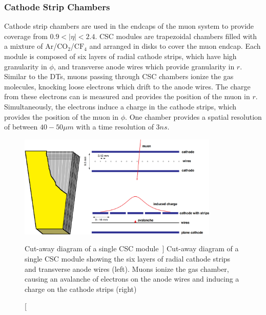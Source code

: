\subsubsection{Cathode Strip Chambers} \label{sec:CMS_CSC}
Cathode strip chambers are used in the endcaps of the muon system to provide coverage from $0.9<\left|\eta\right|<2.4$. CSC modules are trapezoidal chambers filled with a mixture of Ar/$\text{CO}_2$/$\text{CF}_4$ and arranged in disks to cover the muon endcap. Each module is composed of six layers of radial cathode strips, which have high granularity in $\phi$, and transverse anode wires which provide granularity in $r$. Similar to the DTs, muons passing through CSC chambers ionize the gas molecules, knocking loose electrons which drift to the anode wires. The charge from these electrons can is measured and provides the position of the muon in $r$. Simultaneously, the electrons induce a charge in the cathode strips, which provides the position of the muon in $\phi$. One chamber provides a spatial resolution of between $40-50\unit{\mu m}$ with a time resolution of $3\unit{ns}$.

\begin{figure}[htpb]
	\centering
	\includegraphics[width=0.85\textwidth]{figs/03_experiment/cms_csc.pdf}
	\caption
	[Cut-away diagram of a single CSC module~\cite{DeBruyn:2797803}]
	{Cut-away diagram of a single CSC module showing the six layers of radial cathode strips and transverse anode wires (left). Muons ionize the gas chamber, causing an avalanche of electrons on the anode wires and inducing a charge on the cathode strips (right)~\cite{DeBruyn:2797803}}
	\label{fig:CSC}
\end{figure}

